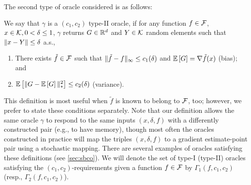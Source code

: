 The second type of oracle considered is as follows:
\begin{definition}
\label{def:oracle2}
We say that $\gamma$ is a  $(c_1,c_2)$ type-II oracle, if for any function $f\in \mathcal{F}$,
$x\in \mathcal{K},0<\delta\le 1$, $\gamma$ returns $G\in \mathbb{R}^d$ and  $Y\in \mathcal{K}$ random elements such that $\|x-Y\|\le \delta$ a.s.,
\vspace{-0.2cm}
\begin{enumerate}
\item There exists $\tilde{f} \in \mathcal{F}$ such that
$\|\tilde{f}- f\|_\infty \le c_1(\delta)$  and
$\mathbb{E}\left[G\right]  = \nabla \tilde{f}(x)$ (bias); and
\item $\mathbb{E}\left[\| G -  \mathbb{E}\left[G\right] \|_*^2\right] \le c_2(\delta)$ (variance).
\end{enumerate}
\end{definition}
This definition is most useful when $\tilde{f}$ is known to belong to $\mathcal{F}$, too; however, we prefer to state these conditions separately.
%
Note that our definition allows the same oracle $\gamma$ to respond to the same inputs $(x,\delta,f)$ with a differently constructed pair (e.g., to have memory),
though most often the oracles constructed in practice
will map the triples $(x,\delta,f)$ to a gradient estimate-point pair using a stochastic mapping.
There are several examples of oracles satisfying these definitions (see \cref{sec:sbco}).
We will denote the set of type-I (type-II) oracles satisfying the $(c_1,c_2)$-requirements given a function $f\in \mathcal{F}$ by $\Gamma_1(f,c_1,c_2)$ (resp., $\Gamma_2(f,c_1,c_2)$).





